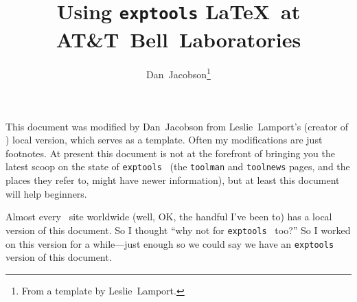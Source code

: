 \newcommand\bs{\char '134 }   %
\newcommand{\lb}{\char '173 } %
\newcommand{\rb}{\char '175 } %

\title{Using {\tt exptools} \LaTeX\ at AT\&T~Bell~Laboratories}

\author{Dan~Jacobson\thanks{From a template by Leslie~Lamport.}}



\maketitle

\tableofcontents

\newpage

\begin{small}
This document was modified by Dan~Jacobson from Leslie~Lamport's
(creator of \LittleLaTeX) local version, which serves as a template.
Often my modifications are just footnotes.  At present this document
is not at the forefront of bringing you the latest scoop on the state
of {\tt exptools} \LittleLaTeX\ (the {\tt toolman} and {\tt toolnews}
pages, and the places they refer to, might have newer information),
but at least this document will help beginners.

Almost every \LittleLaTeX\ site worldwide (well, OK, the handful I've
been to) has a local version of this document.  So I thought ``why not
for {\tt exptools} \LittleLaTeX\ too?''  So I worked on this version
for a while---just enough so we could say we have an {\tt exptools}
version of this document.\par
\end{small}

\par\bigskip

